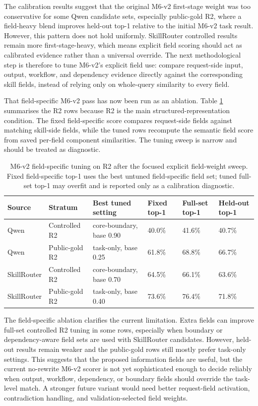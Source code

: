 The calibration results suggest that the original M6-v2 first-stage weight was too conservative for some Qwen candidate sets, especially public-gold R2, where a field-heavy blend improves held-out top-1 relative to the initial M6-v2 task result. However, this pattern does not hold uniformly. SkillRouter controlled results remain more first-stage-heavy, which means explicit field scoring should act as calibrated evidence rather than a universal override. The next methodological step is therefore to tune M6-v2's explicit field use: compare request-side input, output, workflow, and dependency evidence directly against the corresponding skill fields, instead of relying only on whole-query similarity to every field.

That field-specific M6-v2 pass has now been run as an ablation. Table \ref{tab:m6v2-field-specific-v04} summarises the R2 rows because R2 is the main structured-representation condition. The fixed field-specific score compares request-side fields against matching skill-side fields, while the tuned rows recompute the semantic field score from saved per-field component similarities. The tuning sweep is narrow and should be treated as diagnostic.

\begin{table}[h]
\centering
\scriptsize
\setlength{\tabcolsep}{3pt}
\begin{tabular}{p{}p{}p{}p{}p{}p{}}
\toprule
Source & Stratum & Best tuned setting & Fixed top-1 & Full-set top-1 & Held-out top-1 \\
\midrule
Qwen & Controlled R2 & core-boundary, base 0.90 & 40.0\% & 41.6\% & 40.7\% \\
Qwen & Public-gold R2 & task-only, base 0.25 & 61.8\% & 68.8\% & 66.7\% \\
SkillRouter & Controlled R2 & core-boundary, base 0.70 & 64.5\% & 66.1\% & 63.6\% \\
SkillRouter & Public-gold R2 & task-only, base 0.40 & 73.6\% & 76.4\% & 71.8\% \\
\bottomrule
\end{tabular}
\caption{M6-v2 field-specific tuning on R2 after the focused explicit field-weight sweep. Fixed field-specific top-1 uses the best untuned field-specific field set; tuned full-set top-1 may overfit and is reported only as a calibration diagnostic.}
\label{tab:m6v2-field-specific-v04}
\end{table}

The field-specific ablation clarifies the current limitation. Extra fields can improve full-set controlled R2 tuning in some rows, especially when boundary or dependency-aware field sets are used with SkillRouter candidates. However, held-out results remain weaker and the public-gold rows still mostly prefer task-only settings. This suggests that the proposed information fields are useful, but the current no-rewrite M6-v2 scorer is not yet sophisticated enough to decide reliably when output, workflow, dependency, or boundary fields should override the task-level match. A stronger future variant would need better request-field activation, contradiction handling, and validation-selected field weights.

